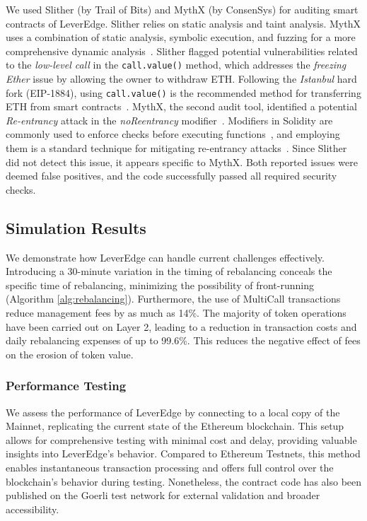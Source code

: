 We used Slither (by Trail of Bits) and MythX (by ConsenSys) for auditing smart contracts of LeverEdge. Slither relies on static analysis and taint analysis. MythX uses a combination of static analysis, symbolic execution, and fuzzing for a more comprehensive dynamic analysis~\cite{Slither_Doc,SlitherSetup,MythX_Doc}. Slither flagged potential vulnerabilities related to the \textit{low-level call} in the \texttt{call.value()} method, which addresses the \textit{freezing Ether} issue by allowing the owner to withdraw ETH. Following the \textit{Istanbul} hard fork (EIP-1884), using \texttt{call.value()} is the recommended method for transferring ETH from smart contracts~\cite{EIP-1884}. MythX, the second audit tool, identified a potential \textit{Re-entrancy} attack in the \textit{noReentrancy} modifier~\cite{Reentrancy}. Modifiers in Solidity are commonly used to enforce checks before executing functions~\cite{SolidityModifer}, and employing them is a standard technique for mitigating re-entrancy attacks~\cite{ReentrancyGuard}. Since Slither did not detect this issue, it appears specific to MythX. Both reported issues were deemed false positives, and the code successfully passed all required security checks.

\subsection{Simulation Results}
We demonstrate how LeverEdge can handle current challenges effectively. Introducing a 30-minute variation in the timing of rebalancing conceals the specific time of rebalancing, minimizing the possibility of front-running (Algorithm \ref{alg:rebalancing}). Furthermore, the use of MultiCall transactions reduce management fees by as much as 14\%. The majority of token operations have been carried out on Layer 2, leading to a reduction in transaction costs and daily rebalancing expenses of up to 99.6\%. This reduces the negative effect of fees on the erosion of token value.

\subsubsection{Performance Testing}\label{appx:testing}
We assess the performance of LeverEdge by connecting to a local copy of the Mainnet, replicating the current state of the Ethereum blockchain. This setup allows for comprehensive testing with minimal cost and delay, providing valuable insights into LeverEdge's behavior. Compared to Ethereum Testnets, this method enables instantaneous transaction processing and offers full control over the blockchain’s behavior during testing. Nonetheless, the contract code has also been published on the Goerli test network for external validation and broader accessibility.

